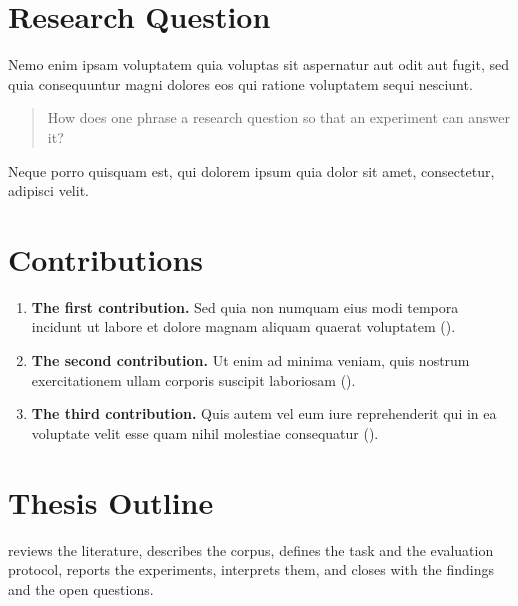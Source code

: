 \section{Research Question}
\label{sec:research-question}

Nemo enim ipsam voluptatem quia voluptas sit aspernatur aut odit aut fugit, sed quia consequuntur magni dolores eos qui ratione voluptatem sequi nesciunt.

\begin{quote}
  How does one phrase a research question so that an experiment can answer it?
\end{quote}

Neque porro quisquam est, qui dolorem ipsum quia dolor sit amet, consectetur, adipisci velit.

\section{Contributions}
\label{sec:contributions}

\begin{enumerate}
  \item \textbf{The first contribution.} Sed quia non numquam eius modi tempora incidunt ut labore et dolore magnam aliquam quaerat voluptatem ().
  \item \textbf{The second contribution.} Ut enim ad minima veniam, quis nostrum exercitationem ullam corporis suscipit laboriosam ().
  \item \textbf{The third contribution.} Quis autem vel eum iure reprehenderit qui in ea voluptate velit esse quam nihil molestiae consequatur ().
\end{enumerate}

\section{Thesis Outline}
\label{sec:thesis-outline}

 reviews the literature,  describes the corpus,  defines the task and the evaluation protocol,  reports the experiments,  interprets them, and  closes with the findings and the open questions.
